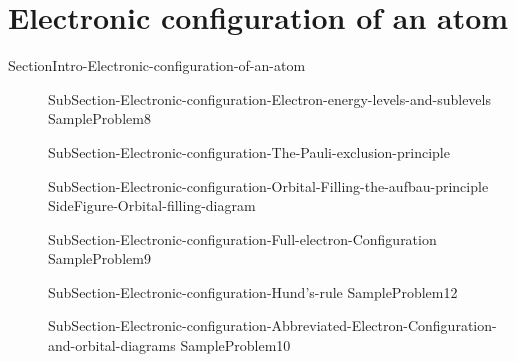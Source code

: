 \documentclass[main.tex]{subfiles}
\newcommand\chapterlabel{Ch-radiation}\setcounter{figurenewcounter}{0}\setcounter{tablenewcounter}{0}\setcounter{formulanewcounter}{0}
\begin{document}
\section{Electronic configuration of an atom}{SectionIntro-Electronic-configuration-of-an-atom}
\sloppy
\begin{description}
\item[] {SubSection-Electronic-configuration-Electron-energy-levels-and-sublevels}
  {SampleProblem8}
\item[] {SubSection-Electronic-configuration-The-Pauli-exclusion-principle}
\item[]{SubSection-Electronic-configuration-Orbital-Filling-the-aufbau-principle}
     \label{Fig:{\chapterlabel}\thefigurenewcounter} 
{SideFigure-Orbital-filling-diagram}
 \item[] {SubSection-Electronic-configuration-Full-electron-Configuration}
  {SampleProblem9}
\item[] {SubSection-Electronic-configuration-Hund's-rule}
{SampleProblem12}
\item[] 
{SubSection-Electronic-configuration-Abbreviated-Electron-Configuration-and-orbital-diagrams}
  {SampleProblem10}
\end{description}
\newpage
\end{document}
